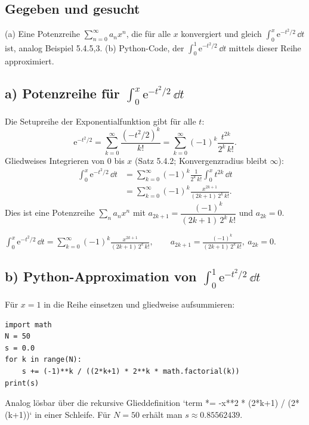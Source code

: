 
\subsection*{Gegeben und gesucht}
(a) Eine Potenzreihe $\sum_{n=0}^{\infty}a_n x^n$, die für alle $x$ konvergiert
und gleich $\int_0^x \mathrm e^{-t^2/2}\,\dd t$ ist, analog Beispiel 5.4.5,3.
(b) Python-Code, der $\int_0^1 \mathrm e^{-t^2/2}\,\dd t$ mittels dieser Reihe
approximiert.

\subsection*{a) Potenzreihe für $\int_0^x \mathrm e^{-t^2/2}\,\dd t$}
Die Setupreihe der Exponentialfunktion gibt für alle $t$:
\begin{equation}
  \mathrm e^{-t^2/2}
  = \sum_{k=0}^{\infty}\frac{(-t^2/2)^k}{k!}
  = \sum_{k=0}^{\infty} (-1)^k \frac{t^{2k}}{2^k\,k!}.
\end{equation}
Gliedweises Integrieren von $0$ bis $x$ (Satz 5.4.2; Konvergenzradius bleibt
$\infty$):
\begin{align}
  \int_0^x \mathrm e^{-t^2/2}\,\dd t
  &= \sum_{k=0}^{\infty} (-1)^k \frac{1}{2^k\,k!}\int_0^x t^{2k}\,\dd t \\
  &= \sum_{k=0}^{\infty} (-1)^k \frac{x^{2k+1}}{(2k+1)\,2^k\,k!}.
\end{align}
Dies ist eine Potenzreihe $\sum_n a_n x^n$ mit
$a_{2k+1}=\dfrac{(-1)^k}{(2k+1)\,2^k\,k!}$ und $a_{2k}=0$.

\begin{ergebnis}
$\displaystyle
\int_0^x \mathrm e^{-t^2/2}\,\dd t
=\sum_{k=0}^{\infty}(-1)^k\frac{x^{2k+1}}{(2k+1)\,2^k\,k!},\qquad
a_{2k+1}=\frac{(-1)^k}{(2k+1)\,2^k\,k!},\ a_{2k}=0$.
\end{ergebnis}

\subsection*{b) Python-Approximation von $\int_0^1 \mathrm e^{-t^2/2}\,\dd t$}
Für $x=1$ in die Reihe einsetzen und gliedweise aufsummieren:
\begin{verbatim}
import math
N = 50
s = 0.0
for k in range(N):
    s += (-1)**k / ((2*k+1) * 2**k * math.factorial(k))
print(s)
\end{verbatim}
Analog lösbar über die rekursive Glieddefinition
`term *= -x**2 * (2*k+1) / (2*(k+1))` in einer Schleife. Für $N=50$ erhält man
$s\approx0.85562439$.

